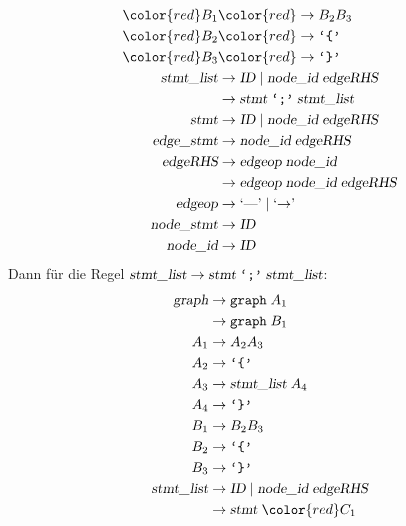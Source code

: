\begin{loesung}
\begin{teilaufgaben}
\begin{align*}
\color{red}B_1     &\color{red}\rightarrow B_2B_3\\
\color{red}B_2     &\color{red}\rightarrow \texttt{`\{'}\\
\color{red}B_3     &\color{red}\rightarrow \texttt{`\}'}\\
\textsl{stmt\_list}&\rightarrow \textsl{ID}\; |\;
                                \textsl{node\_id}\; \textsl{edgeRHS} \\
                   &\rightarrow \textsl{stmt}\; \texttt{`;'}\; \textsl{stmt\_list}\\
\textsl{stmt}      &\rightarrow \textsl{ID}\; |\;
                                \textsl{node\_id}\; \textsl{edgeRHS} \\
\textsl{edge\_stmt}&\rightarrow \textsl{node\_id}\; \textsl{edgeRHS} \\
\textsl{edgeRHS}   &\rightarrow \textsl{edgeop}\; \textsl{node\_id}\\
                   &\rightarrow \textsl{edgeop}\; \textsl{node\_id}\; \textsl{edgeRHS}\\
\textsl{edgeop}    &\rightarrow \textrm{`\text{---}'}\; |\; \textrm{`$\rightarrow$'}\; \\
\textsl{node\_stmt}&\rightarrow \textsl{ID} \\
\textsl{node\_id}  &\rightarrow \textsl{ID}
\end{align*}
Dann für die Regel
$\textsl{stmt\_list}\rightarrow \textsl{stmt}\; \texttt{`;'}\; \textsl{stmt\_list}$:
\begin{align*}
\textsl{graph}     &\rightarrow \texttt{graph}\; A_1 \\
                   &\rightarrow \texttt{graph}\; B_1 \\
A_1                &\rightarrow A_2A_3\\
A_2                &\rightarrow \texttt{`\{'}\\
A_3                &\rightarrow \textsl{stmt\_list}\;A_4\\
A_4                &\rightarrow \texttt{`\}'}\\
B_1                &\rightarrow B_2B_3\\
B_2                &\rightarrow \texttt{`\{'}\\
B_3                &\rightarrow \texttt{`\}'}\\
\textsl{stmt\_list}&\rightarrow \textsl{ID}\; |\;
                                \textsl{node\_id}\; \textsl{edgeRHS} \\
                   &\rightarrow \textsl{stmt}\; \color{red}C_1\\

\end{align*}
\end{teilaufgaben}
\end{loesung}
